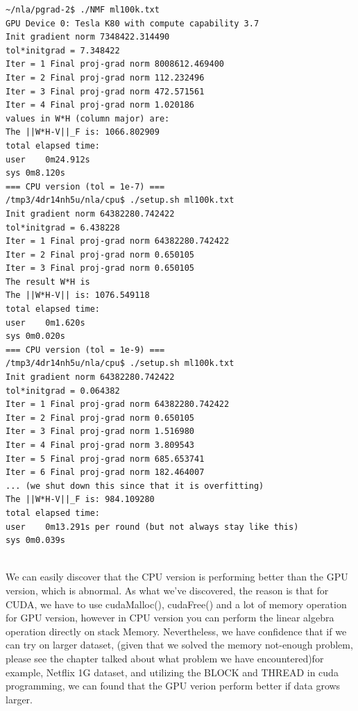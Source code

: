 \documentclass[12pt]{article}
\theoremstyle{remark}
\begin{document}
\begin{CJK}{UTF8}{bsmi}
\mbox{} 
\begin{lstlisting}
~/nla/pgrad-2$ ./NMF ml100k.txt
GPU Device 0: Tesla K80 with compute capability 3.7
Init gradient norm 7348422.314490
tol*initgrad = 7.348422
Iter = 1 Final proj-grad norm 8008612.469400
Iter = 2 Final proj-grad norm 112.232496
Iter = 3 Final proj-grad norm 472.571561
Iter = 4 Final proj-grad norm 1.020186
values in W*H (column major) are:
The ||W*H-V||_F is: 1066.802909
total elapsed time:
user	0m24.912s
sys	0m8.120s
=== CPU version (tol = 1e-7) ===
/tmp3/4dr14nh5u/nla/cpu$ ./setup.sh ml100k.txt
Init gradient norm 64382280.742422
tol*initgrad = 6.438228
Iter = 1 Final proj-grad norm 64382280.742422
Iter = 2 Final proj-grad norm 0.650105
Iter = 3 Final proj-grad norm 0.650105
The result W*H is
The ||W*H-V|| is: 1076.549118
total elapsed time:
user	0m1.620s
sys	0m0.020s
=== CPU version (tol = 1e-9) ===
/tmp3/4dr14nh5u/nla/cpu$ ./setup.sh ml100k.txt
Init gradient norm 64382280.742422
tol*initgrad = 0.064382
Iter = 1 Final proj-grad norm 64382280.742422
Iter = 2 Final proj-grad norm 0.650105
Iter = 3 Final proj-grad norm 1.516980
Iter = 4 Final proj-grad norm 3.809543
Iter = 5 Final proj-grad norm 685.653741
Iter = 6 Final proj-grad norm 182.464007
... (we shut down this since that it is overfitting)
The ||W*H-V||_F is: 984.109280
total elapsed time:
user	0m13.291s per round (but not always stay like this)
sys	0m0.039s
\end{lstlisting}
\mbox{} \\

We can easily discover that the CPU version is performing better than the GPU version, which is abnormal. As what we've discovered, the reason is that for CUDA, we have to use cudaMalloc(), cudaFree() and a lot of memory operation for GPU version, however in CPU version you can perform the linear algebra operation directly on stack Memory. Nevertheless, we have confidence that if we can try on larger dataset, (given that we solved the memory not-enough problem, please see the chapter talked about what problem we have encountered)for example, Netflix 1G dataset, and utilizing the BLOCK and THREAD in cuda programming, we can found that the GPU verion perform better if data grows larger.


\end{CJK}
\end{document}
